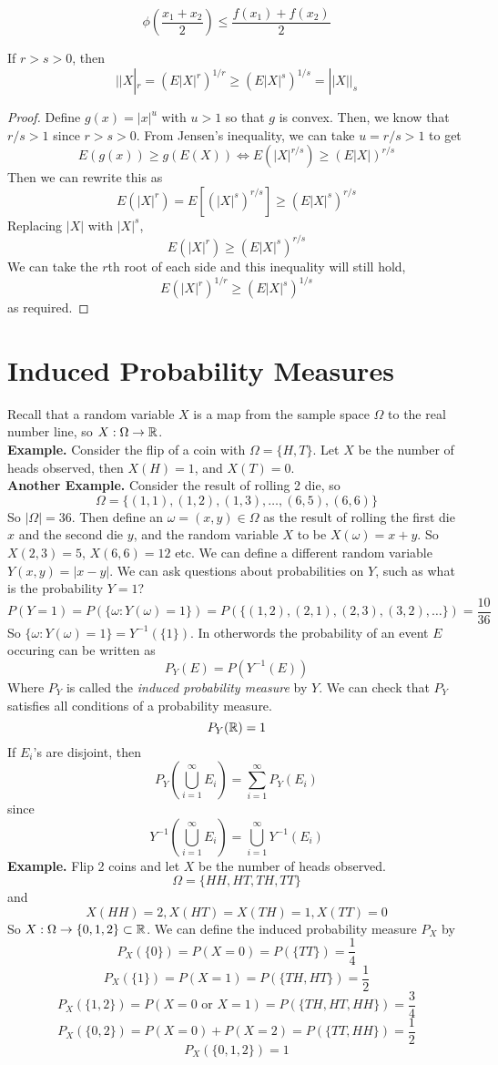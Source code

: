 \documentclass[openany]{report}
\begin{document}
\[\phi\left(\frac{x_1 + x_2}{2}\right) \leq \frac{f(x_1)+f(x_2)}{2}\] 
\begin{theorem}
    If $r > s > 0$, then 
    \[||X|_r = (E|X|^r)^{1/r} \geq (E|X|^s)^{1/s} = ||X||_s\]
\end{theorem}
\begin{proof}
    Define $g(x) = |x|^u$ with $u > 1$ so that $g$ is convex. Then, we know that $r/s > 1$ since $r > s > 0$. From Jensen's inequality, we can take $u = r/s > 1$ to get
    \[E(g(x)) \geq g(E(X)) \iff E(|X|^{r/s}) \geq (E|X|)^{r/s}\]
    Then we can rewrite this as
    \[E(|X|^r) = E\left[(|X|^s)^{r/s}\right] \geq (E|X|^s)^{r/s}\]
    Replacing $|X|$ with $|X|^s$, 
    \[E(|X|^r) \geq (E|X|^s)^{r/s}\]
    We can take the $r$th root of each side and this inequality will still hold, 
    \[E(|X|^r)^{1/r} \geq (E|X|^s)^{1/s}\]
    as required.
\end{proof}
\chapter{Induced Probability Measures}
Recall that a random variable $X$ is a map from the sample space $\Omega$ to the real number line, so $X: \Omega \rightarrow \mathbb{R}$.\\[2ex]
\textbf{Example.} Consider the flip of a coin with $\Omega = \{H,T\}$. Let $X$ be the number of heads observed, then $X(H) = 1$, and $X(T) = 0$.\\[2ex]
\textbf{Another Example.} Consider the result of rolling 2 die, so 
\[\Omega = \{(1,1), (1,2), (1,3), \ldots, (6,5), (6,6)\}\] 
So $|\Omega| = 36$. Then define an $\omega = (x,y) \in \Omega$ as the result of rolling the first die $x$ and the second die $y$, and the random variable $X$ to be $X(\omega) = x + y$. So $X(2,3) = 5$, $X(6,6) = 12$ etc. We can define a different random variable $Y(x,y) = |x-y|$. We can ask questions about probabilities on $Y$, such as what is the probability $Y = 1$? 
\[P(Y = 1) = P(\{\omega: Y(\omega) = 1\}) = P(\{(1,2),(2,1),(2,3),(3,2), \ldots\}) = \frac{10}{36}\]
So $\{\omega: Y(\omega) = 1\} = Y^{-1}(\{1\})$. In otherwords the probability of an event $E$ occuring can be written as 
\[P_Y(E) = P(Y^{-1}(E))\]  
Where $P_Y$ is called the \emph{induced probability measure} by $Y$. We can check that $P_Y$ satisfies all conditions of a probability measure.
\[P_Y(\mathbb{R}) = 1\]
If $E_i$'s are disjoint, then
\[P_Y\left(\bigcup_{i=1}^\infty E_i\right) = \sum_{i=1}^\infty P_Y(E_i)\]
since 
\[Y^{-1}\left(\bigcup_{i=1}^\infty E_i\right) = \bigcup_{i=1}^\infty Y^{-1}(E_i)\]
\noindent
\textbf{Example.} Flip 2 coins and let $X$ be the number of heads observed. 
\[\Omega = \{HH, HT, TH, TT\}\]
and 
\[X(HH) = 2, X(HT) = X(TH) = 1, X(TT) = 0\]
So $X: \Omega \rightarrow \{0,1,2\} \subset \mathbb{R}$. We can define the induced probability measure $P_X$ by
\[P_X(\{0\}) = P(X=0) = P(\{TT\}) = \frac{1}{4}\]
\[P_X(\{1\}) = P(X=1) = P(\{TH, HT\}) = \frac{1}{2}\]
\[P_X(\{1,2\}) = P(X=0 \text{ or } X = 1) = P(\{TH, HT, HH\}) = \frac{3}{4}\]
\[P_X(\{0,2\}) = P(X=0) + P(X = 2) = P(\{TT, HH\}) = \frac{1}{2}\]
\[P_X(\{0,1,2\}) = 1\]
\end{document}
